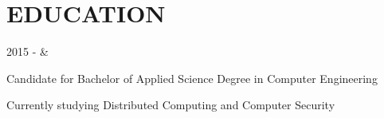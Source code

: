 \documentclass[]{richard-dang}
\begin{document}
\section*{\faMortarBoard \hspace{\FAspace} EDUCATION}
\begin{tabularcv}
    2015 -    &   
                    \begin{tabitemize}
                        \item Candidate for Bachelor of Applied Science Degree in Computer Engineering
                        \item Currently studying Distributed Computing and Computer Security
                    \end{tabitemize} 
                    \\[\vspacepar] 
\end{tabularcv}
\end{document}
